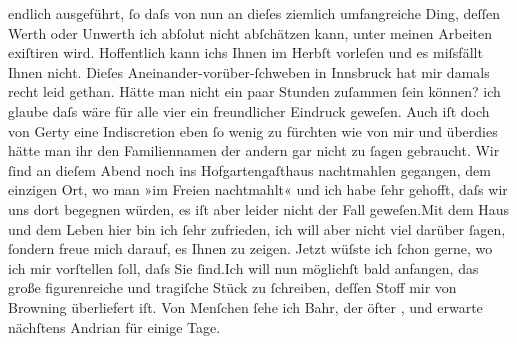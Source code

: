 \begin{ledgroupsized}[t]{13cm}
               endlich ausgeführt, ſo daſs von nun an dieſes ziemlich umfangreiche Ding, deſſen
               Werth oder Unwerth ich abſolut nicht abſchätzen kann, unter meinen Arbeiten exiſtiren
               wird. Hoffentlich kann ichs Ihnen im Herbſt vorleſen und es miſsfällt Ihnen
               nicht.\pend
           \pstart
           Dieſes Aneinander-vorüber-ſchweben in Innsbruck hat
               mir damals recht leid gethan. Hätte man nicht ein paar Stunden zuſammen ſein können?
               ich glaube daſs wäre für alle vier ein freundlicher Eindruck geweſen.
               Auch iſt doch von Gerty eine Indiscretion eben ſo
               wenig zu fürchten wie von mir und überdies hätte man ihr den Familiennamen der andern gar nicht zu ſagen
               gebraucht. Wir ſind an dieſem Abend noch ins Hofgartengaſthaus nachtmahlen gegangen, dem einzigen Ort, wo man »im Freien
               nachtmahlt« und ich habe ſehr gehofft, {\pb}daſs wir uns dort begegnen würden,
               es iſt aber leider nicht der Fall geweſen.\hspace*{2.5em}Mit dem
               Haus und dem Leben hier bin ich ſehr zufrieden, ich will aber nicht viel darüber
               ſagen, ſondern freue mich darauf, es Ihnen zu zeigen. Jetzt wüſste ich ſchon gerne,
               wo ich mir vorſtellen ſoll, daſs Sie ſind.\hspace*{2.5em}Ich will
               nun möglichſt bald anfangen, das große figurenreiche und tragiſche Stück zu ſchreiben, deſſen Stoff mir von Browning überliefert iſt.\pend
           \pstart
           Von Menſchen ſehe ich Bahr, der öfter \label{K_L01149_2v}\label{K_L01149_2h}, und erwarte nächſtens Andrian für einige Tage.\pend

\end{ledgroupsized}

